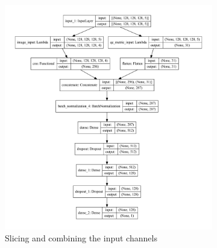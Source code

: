 \documentclass[fleqn,10pt]{wlscirep}
\begin{document}
\begin{figure}[tbp]
    \begin{subfigure}[t]{0.6\textwidth}
    \centering
    \includegraphics[width=\linewidth]{deep-learning-qc/model.pdf}
    \caption{Slicing and combining the input channels}
    \label{fig:dl-architecture:complete}
    \end{subfigure}
    \begin{subfigure}[t]{0.4\textwidth}
    \centering

\end{subfigure}
\end{figure}
\end{document}
